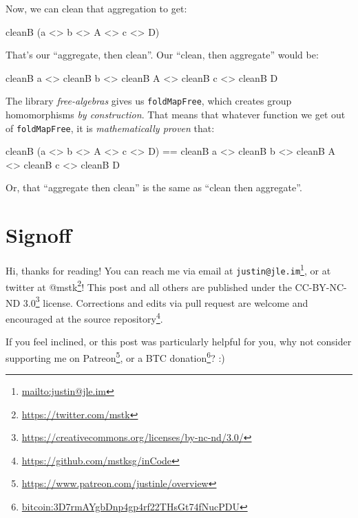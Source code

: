 \documentclass[]{article}
\newenvironment{Shaded}{}{}
\newcommand{\DataTypeTok}[1]{\textcolor[rgb]{0.56,0.13,0.00}{#1}}
\newcommand{\FunctionTok}[1]{\textcolor[rgb]{0.02,0.16,0.49}{#1}}
\newcommand{\NormalTok}[1]{#1}
\renewcommand{\href}[2]{#2\footnote{\url{#1}}}
\begin{document}
Now, we can clean that aggregation to get:

\begin{Shaded}
\begin{Highlighting}[]
\NormalTok{cleanB (a }\FunctionTok{<>}\NormalTok{ b }\FunctionTok{<>} \DataTypeTok{A} \FunctionTok{<>}\NormalTok{ c }\FunctionTok{<>} \DataTypeTok{D}\NormalTok{)}
\end{Highlighting}
\end{Shaded}

That's our ``aggregate, then clean''. Our ``clean, then aggregate'' would be:

\begin{Shaded}
\begin{Highlighting}[]
\NormalTok{cleanB a }\FunctionTok{<>}\NormalTok{ cleanB b }\FunctionTok{<>}\NormalTok{ cleanB }\DataTypeTok{A} \FunctionTok{<>}\NormalTok{ cleanB c }\FunctionTok{<>}\NormalTok{ cleanB }\DataTypeTok{D}
\end{Highlighting}
\end{Shaded}

The library \emph{free-algebras} gives us \texttt{foldMapFree}, which creates
group homomorphisms \emph{by construction}. That means that whatever function we
get out of \texttt{foldMapFree}, it is \emph{mathematically proven} that:

\begin{Shaded}
\begin{Highlighting}[]
\NormalTok{cleanB (a }\FunctionTok{<>}\NormalTok{ b }\FunctionTok{<>} \DataTypeTok{A} \FunctionTok{<>}\NormalTok{ c }\FunctionTok{<>} \DataTypeTok{D}\NormalTok{)}
 \FunctionTok{==}\NormalTok{ cleanB a }\FunctionTok{<>}\NormalTok{ cleanB b }\FunctionTok{<>}\NormalTok{ cleanB }\DataTypeTok{A} \FunctionTok{<>}\NormalTok{ cleanB c }\FunctionTok{<>}\NormalTok{ cleanB }\DataTypeTok{D}
\end{Highlighting}
\end{Shaded}

Or, that ``aggregate then clean'' is the same as ``clean then aggregate''.

\hypertarget{signoff}{%
\section{Signoff}\label{signoff}}

Hi, thanks for reading! You can reach me via email at
\href{mailto:justin@jle.im}{\nolinkurl{justin@jle.im}}, or at twitter at
\href{https://twitter.com/mstk}{@mstk}! This post and all others are published
under the \href{https://creativecommons.org/licenses/by-nc-nd/3.0/}{CC-BY-NC-ND
3.0} license. Corrections and edits via pull request are welcome and encouraged
at \href{https://github.com/mstksg/inCode}{the source repository}.

If you feel inclined, or this post was particularly helpful for you, why not
consider \href{https://www.patreon.com/justinle/overview}{supporting me on
Patreon}, or a \href{bitcoin:3D7rmAYgbDnp4gp4rf22THsGt74fNucPDU}{BTC donation}?
:)
\end{document}
